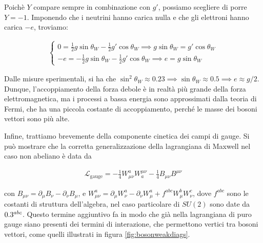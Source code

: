 \documentclass[11pt]{report}
\begin{document}
Poichè \(Y\) compare sempre in combinazione con \(g'\), possiamo scegliere di porre \(Y = -1\). Imponendo che i neutrini hanno carica nulla e che gli elettroni hanno carica \(-e\), troviamo: 

\begin{align}
    \begin{cases}
        0 = \frac{1}{2}g\sin\theta_W - \frac{1}{2}g'\cos\theta_W \implies g\sin\theta_W = g'\cos\theta_W \\
        -e = -\frac{1}{2}g\sin\theta_W - \frac{1}{2}g'\cos\theta_W \implies e = g\sin\theta_W
    \end{cases}
\end{align}

Dalle misure sperimentali, si ha che \(\sin^2\theta_W \approx 0.23 \implies \sin\theta_W \approx 0.5 \implies e \approx g/2\). Dunque, l'accoppiamento della forza debole è in realtà più grande della forza elettromagnetica, ma i processi a bassa energia sono approssimati dalla teoria di Fermi, che ha una piccola costante di accoppiamento, perché le masse dei bosoni vettori sono più alte. 

Infine, trattiamo brevemente della componente cinetica dei campi di gauge. Si può mostrare che la corretta generalizzazione della lagrangiana di Maxwell nel caso non abeliano è data da 

\begin{align}
    \mathcal{L}_{\text{gauge}} = -\frac{1}{4}W^a_{\mu\nu}W^{\mu\nu}_a - \frac{1}{4}B_{\mu\nu}B^{\mu\nu}
\end{align}

con \(B_{\mu\nu} = \partial_\mu B_\nu - \partial_\nu B_\mu\), e \(W_{\mu\nu}^a = \partial_\mu W^a_\nu - \partial_\nu W^a_\mu + f^{abc}W^b_\mu W^c_\nu\), dove \(f^{abc}\) sono le costanti di struttura dell'algebra, nel caso particolare di \(SU(2)\) sono date da \(0.3^{abc}\). Questo termine aggiuntivo fa in modo che già nella lagrangiana di puro gauge siano presenti dei termini di interazione, che permettono vertici tra bosoni vettori, come quelli illustrati in figura \ref{fig:bosonweakdiags}. 
\end{document}
